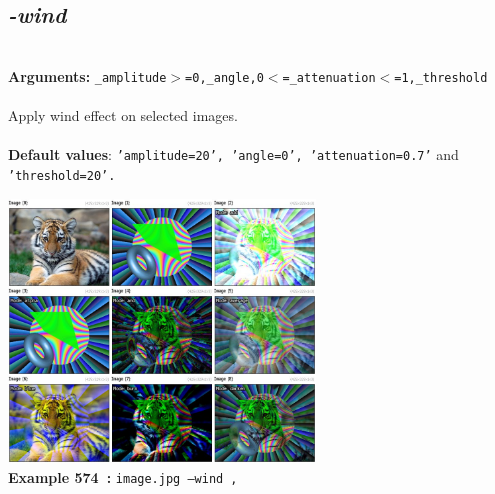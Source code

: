 \documentclass[a4paper,11pt,twoside]{book}
\begin{document}
\subsection{\emph{-wind} }\vspace*{-0.5em}
~\\\textbf{Arguments: } 
{\small \texttt{\_amplitude$>$=0,\_angle,0$<$=\_attenuation$<$=1,\_threshold}}\\~\\
Apply wind effect on selected images.
~\\~\\\textbf{Default values}: {\small \texttt{'amplitude=20', 'angle=0', 'attenuation=0.7'} and \texttt{'threshold=20'.}}
\begin{center}\includegraphics[keepaspectratio=true,height=7cm,width=\textwidth]{img/gmic_def574.jpg}\\
{\footnotesize \textbf{Example 574~:} \texttt{image.jpg --wind ,}}
\end{center}
\end{document}
